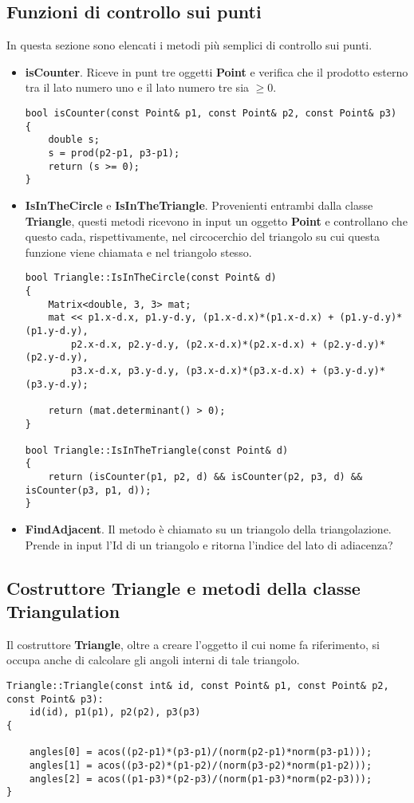 \documentclass{article}
\begin{document}
\subsection{Funzioni di controllo sui punti}
In questa sezione sono elencati i metodi più semplici di controllo sui punti.

\begin{itemize}
\item \textbf{isCounter}.  Riceve in punt tre oggetti \textbf{Point} e verifica che il prodotto esterno tra il lato numero uno e il lato numero tre sia $\geq 0$.
\begin{lstlisting}
bool isCounter(const Point& p1, const Point& p2, const Point& p3)
{
    double s;
    s = prod(p2-p1, p3-p1);
    return (s >= 0);
}
\end{lstlisting}
\item \textbf{IsInTheCircle} e \textbf{IsInTheTriangle}.  Provenienti entrambi dalla classe \textbf{Triangle},  questi metodi ricevono in input un oggetto \textbf{Point} e controllano che questo cada,  rispettivamente, nel circocerchio del triangolo su cui questa funzione viene chiamata e nel triangolo stesso.
\begin{lstlisting}
bool Triangle::IsInTheCircle(const Point& d)
{
    Matrix<double, 3, 3> mat;
    mat << p1.x-d.x, p1.y-d.y, (p1.x-d.x)*(p1.x-d.x) + (p1.y-d.y)*(p1.y-d.y),
        p2.x-d.x, p2.y-d.y, (p2.x-d.x)*(p2.x-d.x) + (p2.y-d.y)*(p2.y-d.y),
        p3.x-d.x, p3.y-d.y, (p3.x-d.x)*(p3.x-d.x) + (p3.y-d.y)*(p3.y-d.y);

    return (mat.determinant() > 0);
}

bool Triangle::IsInTheTriangle(const Point& d)
{
    return (isCounter(p1, p2, d) && isCounter(p2, p3, d) && isCounter(p3, p1, d));
}
\end{lstlisting}
\item \textbf{FindAdjacent}.  Il metodo è chiamato su un triangolo della triangolazione.  Prende in input l'Id di un triangolo e ritorna l'indice del lato di adiacenza?
\end{itemize}


\subsection{Costruttore Triangle e metodi della classe Triangulation}
Il costruttore \textbf{Triangle},  oltre a creare l'oggetto il cui nome fa riferimento,  si occupa anche di calcolare gli angoli interni di tale triangolo.
\begin{lstlisting}
Triangle::Triangle(const int& id, const Point& p1, const Point& p2, 
const Point& p3):
    id(id), p1(p1), p2(p2), p3(p3)
{
    
    angles[0] = acos((p2-p1)*(p3-p1)/(norm(p2-p1)*norm(p3-p1)));
    angles[1] = acos((p3-p2)*(p1-p2)/(norm(p3-p2)*norm(p1-p2)));
    angles[2] = acos((p1-p3)*(p2-p3)/(norm(p1-p3)*norm(p2-p3)));
}
\end{lstlisting}
\end{document}
